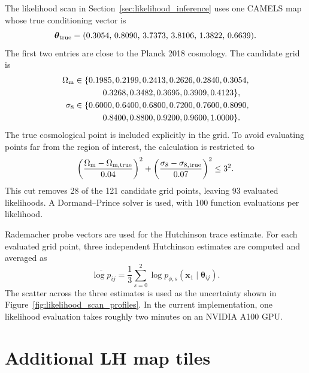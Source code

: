 \documentclass[usenatbib]{mnras}
\newcommand{\Om}{\Omega_{\rm m}}
\newcommand{\sig}{\sigma_8}
\newcommand{\thetavec}{\boldsymbol{\theta}}
\begin{document}
The likelihood scan in Section~\ref{sec:likelihood_inference} uses one
CAMELS map whose true conditioning vector is
\begin{equation}
  \thetavec_{\rm true}
  =
  (0.3054,\,0.8090,\,3.7373,\,3.8106,\,1.3822,\,0.6639).
  \label{eq:scan_true_params}
\end{equation}
The first two entries are close to the Planck 2018 cosmology. The
candidate grid is
\begin{align}
  \Om &\in
  \{0.1985,0.2199,0.2413,0.2626,0.2840,0.3054,\nonumber\\
      &\hspace{1.2cm}
        0.3268,0.3482,0.3695,0.3909,0.4123\},\\
  \sig &\in
  \{0.6000,0.6400,0.6800,0.7200,0.7600,0.8090,\nonumber\\
       &\hspace{1.2cm}
         0.8400,0.8800,0.9200,0.9600,1.0000\}.
\end{align}
The true cosmological point is included explicitly in the grid. To
avoid evaluating points far from the region of interest, the calculation
is restricted to
\begin{equation}
  \left(
  \frac{\Om-\Omega_{{\rm m},{\rm true}}}{0.04}
  \right)^2
  +
  \left(
  \frac{\sig-\sigma_{8,{\rm true}}}{0.07}
  \right)^2
  \leq 3^2 .
  \label{eq:scan_ellipse}
\end{equation}
This cut removes 28 of the 121 candidate grid points, leaving 93
evaluated likelihoods. A Dormand--Prince solver is used, with 100
function evaluations per likelihood.

Rademacher probe vectors are used for the Hutchinson trace estimate.
For each evaluated grid point, three independent Hutchinson estimates
are computed and averaged as
\begin{equation}
  \overline{\log p}_{ij}
  =
  \frac{1}{3}
  \sum_{s=0}^{2}
  \log p_{\phi,s}
  (\mathbf{x}_1\mid\thetavec_{ij}).
  \label{eq:hutchinson_mean}
\end{equation}
The scatter across the three estimates is used as the uncertainty shown
in Figure~\ref{fig:likelihood_scan_profiles}. In the current
implementation, one likelihood evaluation takes roughly two minutes on
an NVIDIA A100 GPU.

\clearpage
\onecolumn

\section{Additional LH map tiles}
\label{app:lh_tiles}
\end{document}
